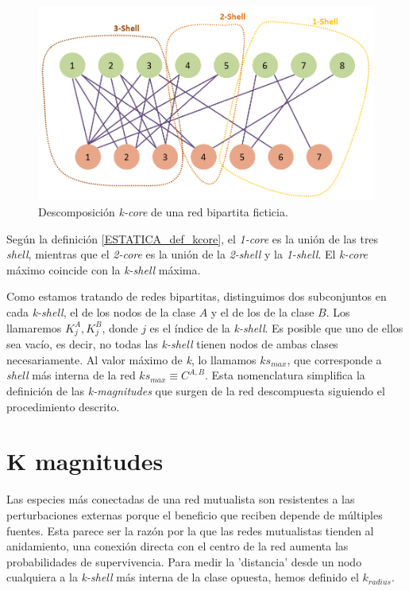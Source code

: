 \begin{figure}[h!]
\centering
\includegraphics[scale=0.5]{Figures/ESTATICA_kcore_decomposition_example.png}
\caption{Descomposición \textit{k-core} de una red bipartita ficticia.}
\label{fig:ESTATICA_kcore_decomposition_example}
\end{figure}

Según la definición \ref{ESTATICA_def_kcore}, el  \textit{1-core} es la unión de las tres \textit{shell}, mientras que el \textit{2-core} es la unión de la \textit{2-shell} y la \textit{1-shell}. El \textit{k-core} máximo coincide con la  \textit{k-shell} máxima. 

Como estamos tratando de redes bipartitas, distinguimos dos subconjuntos en cada \textit{k-shell}, el de los nodos de la clase $A$ y el de los de la clase $B$. Los llamaremos $K^{A}_{j}, K^{B}_{j}$, donde  $j$ es el índice de la \textit{k-shell}.
Es posible que uno de ellos sea vacío, es decir, no todas las \textit{k-shell} tienen nodos de ambas clases necesariamente.
Al valor máximo de \textit{k}, lo llamamos $ks_{max}$, que corresponde a \textit{shell} más interna de la red $ks_{max}\equiv C^{A,B}$. Esta nomenclatura simplifica la definición de las \textit{k-magnitudes} que surgen de la red descompuesta siguiendo el procedimiento descrito.


\section{K magnitudes}

Las especies más conectadas de una red mutualista son resistentes a las perturbaciones externas porque el beneficio que reciben depende de múltiples fuentes. Esta parece ser la razón por la que las redes mutualistas tienden al anidamiento, una conexión directa con el centro de la red aumenta las probabilidades de supervivencia. Para medir la 'distancia' desde un nodo cualquiera a la \textit{k-shell} más interna de la clase opuesta, hemos definido el \textit{$k_{radius}$}.

